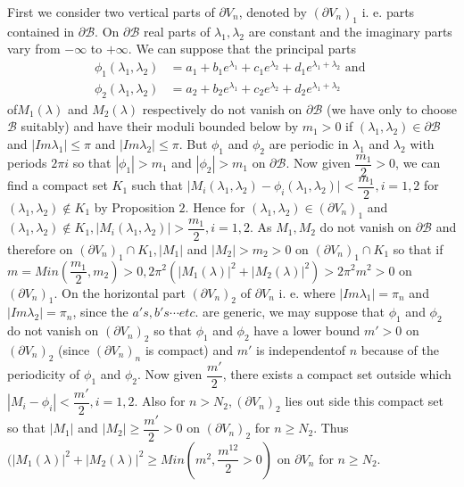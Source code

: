 First we consider two vertical parts of $\partial V_n$, denoted by
$(\partial V_n)_1$ i. e. parts contained in $\partial \mathscr{B}$. On
$\partial \mathscr{B}$ real parts of $\lambda_1,  \lambda_2$ are
constant and the imaginary parts vary from $- \infty$ to $+
\infty$. We can suppose that the principal parts 
\begin{align*}
  \phi_1 (\lambda_1,  \lambda_2) & = a_1 + b_1 e^{\lambda_1} + c_1
  e^{\lambda_2} + d_1 e^{\lambda_1 +\lambda_2} \text{ and } \\ 
  \phi_2 (\lambda_1,  \lambda_2) &= a_2 + b_2 e^{\lambda_1} + c_2
  e^{\lambda_2} + d_2 e^{\lambda_1 +\lambda_2} 
\end{align*}
of\pageoriginale $M_1(\lambda)$ and $M_2(\lambda)$ respectively do not vanish on $
\partial \mathscr{B}$ (we have only to choose $\mathscr{B}$ suitably)
and have their moduli bounded below by $m_1 > 0$ if $(\lambda_1,
\lambda_2) \in \partial \mathscr{B}$ and $|Im \lambda_1| \leq \pi$
and $|Im \lambda_2| \leq \pi$. But $\phi_1$ and $\phi_2$ are
periodic in $\lambda_1$ and $\lambda_2$ with periods $2 \pi i$ so
that $|\phi_1| > m_1$ and $|\phi_2| > m_1$ on $\partial
\mathscr{B}$. Now given $\dfrac{m_1}{2} > 0$, we can find a compact
set $K_1$ such that $\big | M_i (\lambda_1, \lambda_2) - \phi_i
(\lambda_1, \lambda_2) \big| < \dfrac{m_1}{2}, i=1, 2$ for
$(\lambda_1,\lambda_2) \notin K_1$ by Proposition $2$. Hence for
$(\lambda_1,\lambda_2) \in (\partial V_n)_1$ and
$(\lambda_1,\lambda_2) \notin K_1, |M_i (\lambda_1,\lambda_2)|  >
\dfrac{m_1}{2}, i = 1, 2$. As $M_1, M_2$ do not vanish on $\partial
\mathscr{B}$ and therefore on $(\partial V_n)_1 \cap K_1, |M_1|$ and
$|M_2| > m_2 > 0$ on $(\partial V_n)_1 \cap K_1$ so that if $m = Min
(\dfrac{m_1}{2}, m_2) > 0, 2 \pi^2 (|M_1 (\lambda)|^2 + |M_2
(\lambda)|^2) > 2 \pi^2 m^2 > 0$ on $(\partial V_n)_1$. On the
horizontal part $(\partial V_n)_2$ of $\partial V_n$ i. e. where $|Im
\lambda_1| = \pi_n$ and $|Im \lambda_2| = \pi_n$, since the $a's, b's
\cdots etc$. are generic, we may suppose that $\phi_1$ and $\phi_2$ do
not vanish on $(\partial V_n)_2$ so that $\phi_1$ and $\phi_2$ have a
lower bound $m' > 0$ on $(\partial V_n)_2$ (since $(\partial V_n)_n$
is compact) and $m'$ is independent\pageoriginale of $n$ because of the
periodicity of $\phi_1$ and $\phi_2$. Now given $\dfrac{m'}{2}$, there
exists a compact set outside which $|M_i - \phi_i | < \dfrac{m'}{2},
i=1,2$. Also for $n > N_2, (\partial V_n)_2$ lies out side this compact
set so that $|M_1|$ and $|M_2| \geq \dfrac{m'}{2} > 0$ on $(\partial
V_n)_2$ for $n \ge N_2$. Thus $(|M_1 (\lambda)|^2 + |M_2 (\lambda)|^2
\ge Min (m^2,  \dfrac{m^{12}}{2} >0)$ on $\partial V_n$ for $n \geq
N_2$. 

